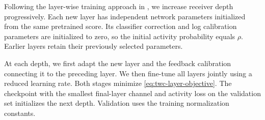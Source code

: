 Following the layer-wise training approach in \cite{wei2026}, we
increase receiver depth progressively. Each new layer has independent
network parameters initialized from the same pretrained score.
Its classifier correction and log calibration parameters are
initialized to zero, so the initial activity probability equals $\rho$.
Earlier layers retain their previously selected parameters.

At each depth, we first adapt the new layer and the feedback
calibration connecting it to the preceding layer. We then fine-tune all
layers jointly using a reduced learning rate. Both stages minimize
\eqref{eq:twc-layer-objective}. The checkpoint with the smallest
final-layer channel and activity loss on the validation set initializes
the next depth. Validation uses the training normalization constants.
